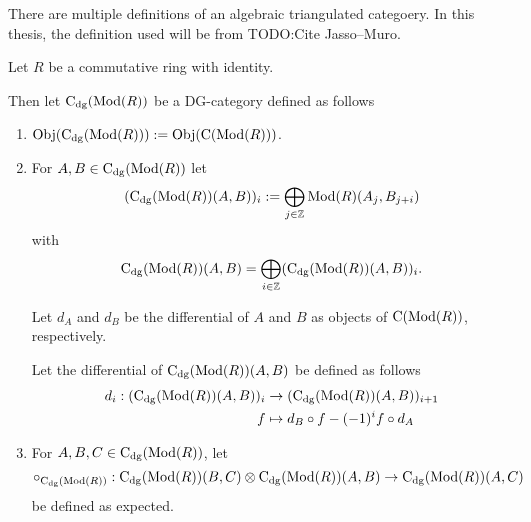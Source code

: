 There are multiple definitions of an algebraic triangulated categoery. In this thesis, the definition used will be from TODO:Cite Jasso--Muro.

\begin{definition}[\( \C_{\dg}(\Mod(R)) \)]
    Let \( R \) be a commutative ring with identity.

    Then let \emph{\( \C_{\dg}(\Mod(R)) \)} be a DG-category defined as follows
    \begin{enumerate}
        \item {
            \( \operatorname{Obj}(\operatorname{C}_{\operatorname{dg}}(\operatorname{Mod}(R))) := \operatorname{Obj}(\operatorname{C}(\operatorname{Mod}(R))) \).
        }
        \item {
            For \( A, B \in \operatorname{C}_{\operatorname{dg}}(\operatorname{Mod}(R)) \) let
            \[ 
                (\operatorname{C}_{\operatorname{dg}}(\operatorname{Mod}(R))(A, B))_i := \bigoplus_{j \in {\mathbb{Z}}} \operatorname{Mod}(R)(A_j, B_{j + i})
            \]
            with
            \[
                \operatorname{C}_{\operatorname{dg}}(\operatorname{Mod}(R))(A, B) = \bigoplus_{i \in {\mathbb{Z}}} (\operatorname{C}_{\operatorname{dg}}(\operatorname{Mod}(R))(A, B))_i.
            \]

            Let \( d_A \) and \( d_B \) be the differential of \( A \) and \( B \) as objects of \( \operatorname{C}(\operatorname{Mod}(R)) \), respectively.

            Let the differential of \( \operatorname{C}_{\operatorname{dg}}(\operatorname{Mod}(R))(A, B) \) be defined as follows
            \begin{align*}
                d_i: (\operatorname{C}_{\operatorname{dg}}(\operatorname{Mod}(R))(A, B))_i &\to (\operatorname{C}_{\operatorname{dg}}(\operatorname{Mod}(R))(A, B))_{i + 1} \\
                f &\mapsto d_B \circ f - (-1)^i f \circ d_A
            \end{align*}
        }
        \item {
            For \( A, B, C \in \operatorname{C}_{\operatorname{dg}}(\operatorname{Mod}(R)) \), let
            \[
                \circ_{\operatorname{C}_{\operatorname{dg}}(\operatorname{Mod}(R))}: \operatorname{C}_{\operatorname{dg}}(\operatorname{Mod}(R))(B, C) \otimes \operatorname{C}_{\operatorname{dg}}(\operatorname{Mod}(R))(A, B) \to \operatorname{C}_{\operatorname{dg}}(\operatorname{Mod}(R))(A, C)
            \]
            be defined as expected.
        }
    \end{enumerate}
\end{definition}

